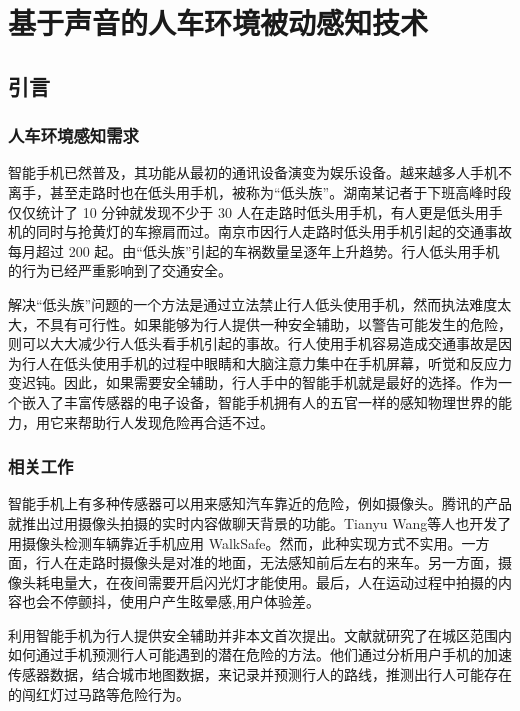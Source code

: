 \chapter{基于声音的人车环境被动感知技术}
\section{引言}
\subsection{人车环境感知需求}
智能手机已然普及，其功能从最初的通讯设备演变为娱乐设备。越来越多人手机不离手，甚至走路时也在低头用手机，被称为“低头族”。湖南某记者于下班高峰时段仅仅统计了 10 分钟就发现不少于 30 人在走路时低头用手机，有人更是低头用手机的同时与抢黄灯的车擦肩而过。南京市因行人走路时低头用手机引起的交通事故每月超过 200 起。由“低头族”引起的车祸数量呈逐年上升趋势。行人低头用手机的行为已经严重影响到了交通安全。


解决“低头族”问题的一个方法是通过立法禁止行人低头使用手机，然而执法难度太大，不具有可行性。如果能够为行人提供一种安全辅助，以警告可能发生的危险，则可以大大减少行人低头看手机引起的事故。行人使用手机容易造成交通事故是因为行人在低头使用手机的过程中眼睛和大脑注意力集中在手机屏幕，听觉和反应力变迟钝。因此，如果需要安全辅助，行人手中的智能手机就是最好的选择。作为一个嵌入了丰富传感器的电子设备，智能手机拥有人的五官一样的感知物理世界的能力，用它来帮助行人发现危险再合适不过。

\subsection{相关工作}

智能手机上有多种传感器可以用来感知汽车靠近的危险，例如摄像头。腾讯的产品就推出过用摄像头拍摄的实时内容做聊天背景的功能。Tianyu Wang等人也开发了用摄像头检测车辆靠近手机应用 WalkSafe。然而，此种实现方式不实用。一方面，行人在走路时摄像头是对准的地面，无法感知前后左右的来车。另一方面，摄像头耗电量大，在夜间需要开启闪光灯才能使用。最后，人在运动过程中拍摄的内容也会不停颤抖，使用户产生眩晕感,用户体验差。


利用智能手机为行人提供安全辅助并非本文首次提出。文献\cite{datta2014towards}就研究了在城区范围内如何通过手机预测行人可能遇到的潜在危险的方法。他们通过分析用户手机的加速传感器数据，结合城市地图数据，来记录并预测行人的路线，推测出行人可能存在的闯红灯过马路等危险行为。


